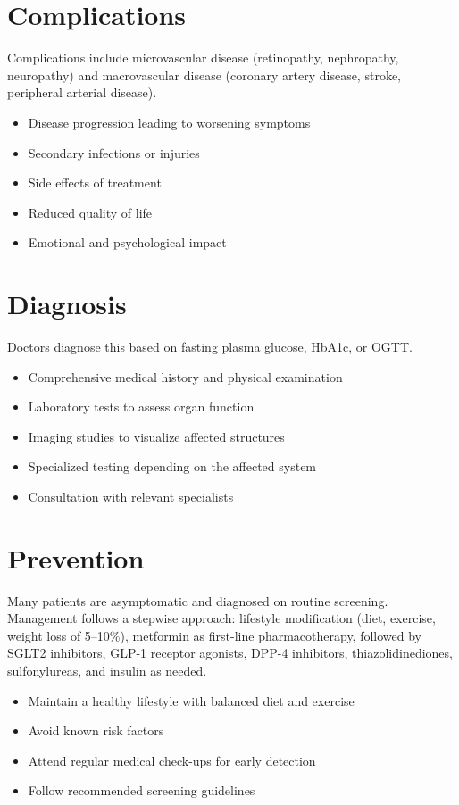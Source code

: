 \section{Complications}
Complications include microvascular disease (retinopathy, nephropathy, neuropathy) and macrovascular disease (coronary artery disease, stroke, peripheral arterial disease).

\begin{itemize}[noitemsep]
  \item Disease progression leading to worsening symptoms
  \item Secondary infections or injuries
  \item Side effects of treatment
  \item Reduced quality of life
  \item Emotional and psychological impact
\end{itemize}
\section{Diagnosis}
Doctors diagnose this based on fasting plasma glucose, HbA1c, or OGTT.

\begin{itemize}[noitemsep]
  \item Comprehensive medical history and physical examination
  \item Laboratory tests to assess organ function
  \item Imaging studies to visualize affected structures
  \item Specialized testing depending on the affected system
  \item Consultation with relevant specialists
\end{itemize}
\section{Prevention}
Many patients are asymptomatic and diagnosed on routine screening. Management follows a stepwise approach: lifestyle modification (diet, exercise, weight loss of 5--10\%), metformin as first-line pharmacotherapy, followed by SGLT2 inhibitors, GLP-1 receptor agonists, DPP-4 inhibitors, thiazolidinediones, sulfonylureas, and insulin as needed.

\begin{itemize}[noitemsep]
  \item Maintain a healthy lifestyle with balanced diet and exercise
  \item Avoid known risk factors
  \item Attend regular medical check-ups for early detection
  \item Follow recommended screening guidelines
\end{itemize}
